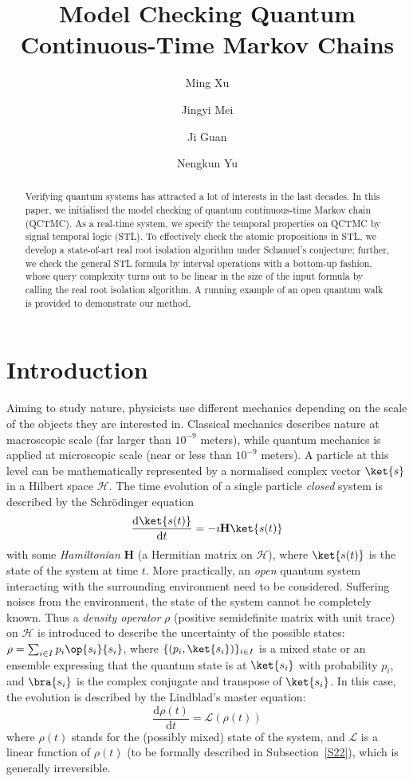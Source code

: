 \documentclass[a4paper,UKenglish,cleveref,autoref,thm-restate,authorcolumns]{lipics-v2019}
\title{Model Checking Quantum Continuous-Time Markov Chains}
\author{Ming Xu}{Shanghai Key Lab of Trustworthy Computing,
East China Normal University, China}{mxu@cs.ecnu.edu.cn}{}{}
\author{Jingyi Mei}{Shanghai Key Lab of Trustworthy Computing,
East China Normal University, China}{mjyecnu@163.com}{}{}
\author{Ji Guan}{State Key Lab of Computer Science, Institute of Software,
Chinese Academy of Sciences, China}{guanji1992@gmail.com}{}{}
\author{Nengkun Yu}{Centre for Quantum Software and Information,
University of Technology Sydney, Australia}{nengkunyu@gmail.com}{}{}
\newcommand{\h}{\mathcal{H}}
\renewcommand{\L}{\mathcal{L}}
\newcommand{\HH}{\mathbf{H}}
\newcommand{\dd}{\mathrm{d}}
\begin{document}
	
\maketitle

\begin{abstract}
	Verifying quantum systems has attracted a lot of interests in the last decades.
	In this paper, we initialised the model checking of quantum continuous-time Markov chain (QCTMC).
	As a real-time system,
	we specify the temporal properties on QCTMC by signal temporal logic (STL).
	To effectively check the atomic propositions in STL,
	we develop a state-of-art real root isolation algorithm under Schanuel's conjecture;
	further, we check the general STL formula by interval operations with a bottom-up fashion,
	whose query complexity turns out to be linear in the size of the input formula
	by calling the real root isolation algorithm.
	A running example of an open quantum walk is provided to demonstrate our method.
\end{abstract}


\section{Introduction}
Aiming to study nature,
physicists use different mechanics depending on the scale of the objects
they are interested in.
Classical mechanics describes nature at macroscopic scale
(far larger than $10^{-9}$ meters),
while quantum mechanics is applied at microscopic scale (near or less than $10^{-9}$ meters). 
A particle at this level can be mathematically represented
by a normalised complex vector $\ket{s}$ in a Hilbert space $\h$. 
The time evolution of a single particle \emph{closed} system is described by
the Schr\"odinger equation 
\begin{equation}\label{eq:schrodinger}
	\frac{\dd\ket{s(t)}}{\dd t} = -\imath \HH\ket{s(t)}
\end{equation}
with some \emph{Hamiltonian} $\HH$ (a Hermitian matrix on $\h$),
where $\ket{s(t)}$ is the state of the system at time $t$. 
More practically,
an \emph{open} quantum system interacting with the surrounding environment need to be considered.
Suffering noises from the environment,
the state of the system cannot be completely known.
Thus a \emph{density operator} $\rho$ (positive semidefinite matrix with unit trace) on $\h$
is introduced to describe the uncertainty of the possible states: 
$\rho = \sum_{i\in I} p_i\op{s_i}{s_i}$,
where $\{(p_i,\ket{s_i})\}_{i\in I}$ is a mixed state
or an ensemble expressing that the quantum state is at $\ket{s_i}$ with probability $p_i$,
and $\bra{s_i}$ is the complex conjugate and transpose of $\ket{s_i}$.
In this case, the evolution is described by the Lindblad's master equation:
\begin{equation}\label{Lind}
	\frac{\dd \rho(t)}{\dd t}=\L(\rho(t))
\end{equation}
where $\rho(t)$ stands for the (possibly mixed) state of the system,
and $\L$ is a linear function of $\rho(t)$ (to be formally described in Subsection~\ref{S22}),
which is generally irreversible.
\end{document}
